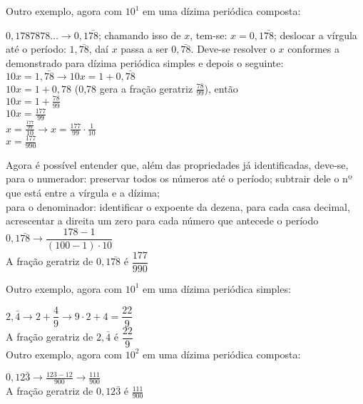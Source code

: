 Outro exemplo, agora com $ 10^1 $ em uma dízima periódica composta:
\begin{multicols}{2}
	\setlength{\columnseprule}{.5pt}
	$ 0,1787878 \hdots  \longrightarrow 0,1\bar{78} $;
	chamando isso de $ x $, tem-se: $ x = 0,1\bar{78} $;
	deslocar a vírgula até o período: $ 1,\bar{78} $, daí $ x $ passa a ser $ 0,\bar{78} $. Deve-se resolver o $ x $ conformes a demonstrado para dízima periódica simples e depois o seguinte: \\
	$ 10x = 1,\bar{78} \longrightarrow 10x = 1 + 0,\bar{78} $\\
	$ 10x = 1 + 0,78 $ (0,78 gera a fração geratriz $ \frac{78}{99} $), então \\
	$ 10x = 1 + \frac{78}{99} $\\
	$ 10x = \frac{177}{99} $\\
	$ x = \frac{\frac{177}{99}}{10} \longrightarrow x = \frac{177}{99}\cdot\frac{1}{10} $\\
	\noindent$ x = \frac{177}{990} $
	
	\columnbreak
	Agora é possível entender que, além das propriedades já identificadas, deve-se, para o numerador: preservar todos os números até o período; subtrair dele o nº que está entre a vírgula e a dízima;\\
	para o denominador: identificar o expoente da dezena, para cada casa decimal, acrescentar a direita um zero para cada número que antecede o período\\
	
	$ 0,1\bar{78} \longrightarrow \dfrac{178 - 1}{(100-1) \cdot 10} $\\
	A fração geratriz de $ 0,1\bar{78} $ é $ \dfrac{177}{990} $
	
\end{multicols}

Outro exemplo, agora com $ 10^1 $ em uma dízima periódica simples:
	
	$ 2,\bar{4} \longrightarrow 2 + \dfrac{4}{9} \longrightarrow 9 \cdot 2 + 4 = \dfrac{22}{9} $\\
	A fração geratriz de $ 2,\bar{4} $ é $ \dfrac{22}{9} $\\

Outro exemplo, agora com $ 10^2 $ em uma dízima periódica composta:

$ 0,12\bar{3} \longrightarrow \frac{123-12}{900} \longrightarrow \frac{111}{900} $\\
A fração geratriz de $ 0,12\bar{3} $ é $ \frac{111}{900} $\\

